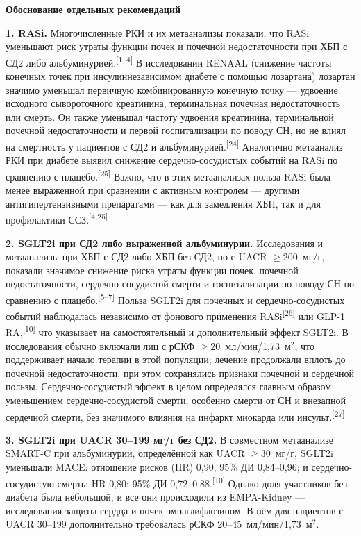 \documentclass[11pt,a4paper]{article}
\newcommand{\src}[1]{\textsuperscript{[#1]}}
\newcommand{\heading}[1]{\par\medskip\textbf{#1}\par}
\newcommand{\unitgfr}{мл/мин/1,73~м$^2$}
\begin{document}
\heading{Обоснование отдельных рекомендаций}
\textbf{1. RASi.} Многочисленные РКИ и их метаанализы показали, что RASi уменьшают риск утраты функции почек и почечной недостаточности при ХБП с СД2 либо альбуминурией.\src{1--4} В исследовании RENAAL (снижение частоты конечных точек при инсулиннезависимом диабете с помощью лозартана) лозартан значимо уменьшал первичную комбинированную конечную точку --- удвоение исходного сывороточного креатинина, терминальная почечная недостаточность или смерть. Он также уменьшал частоту удвоения креатинина, терминальной почечной недостаточности и первой госпитализации по поводу СН, но не влиял на смертность у пациентов с СД2 и альбуминурией.\src{24} Аналогично метаанализ РКИ при диабете выявил снижение сердечно-сосудистых событий на RASi по сравнению с плацебо.\src{25} Важно, что в этих метаанализах польза RASi была менее выраженной при сравнении с активным контролем --- другими антигипертензивными препаратами --- как для замедления ХБП, так и для профилактики ССЗ.\src{4,25}

\textbf{2. SGLT2i при СД2 либо выраженной альбуминурии.} Исследования и метаанализы при ХБП с СД2 либо ХБП без СД2, но с UACR $\geq200$~мг/г, показали значимое снижение риска утраты функции почек, почечной недостаточности, сердечно-сосудистой смерти и госпитализации по поводу СН по сравнению с плацебо.\src{5--7} Польза SGLT2i для почечных и сердечно-сосудистых событий наблюдалась независимо от фонового применения RASi\src{26} или GLP-1 RA,\src{10} что указывает на самостоятельный и дополнительный эффект SGLT2i. В исследования обычно включали лиц с рСКФ $\geq20$~\unitgfr, что поддерживает начало терапии в этой популяции; лечение продолжали вплоть до почечной недостаточности, при этом сохранялись признаки почечной и сердечной пользы. Сердечно-сосудистый эффект в целом определялся главным образом уменьшением сердечно-сосудистой смерти, особенно смерти от СН и внезапной сердечной смерти, без значимого влияния на инфаркт миокарда или инсульт.\src{27}

\textbf{3. SGLT2i при UACR 30--199 мг/г без СД2.} В совместном метаанализе SMART-C при альбуминурии, определённой как UACR $\geq30$~мг/г, SGLT2i уменьшали MACE: отношение рисков (HR) 0,90; 95\% ДИ 0,84--0,96; и сердечно-сосудистую смерть: HR 0,80; 95\% ДИ 0,72--0,88.\src{10} Однако доля участников без диабета была небольшой, и все они происходили из EMPA-Kidney --- исследования защиты сердца и почек эмпаглифлозином. В нём для пациентов с UACR 30--199 дополнительно требовалась рСКФ 20--45~\unitgfr.
\end{document}

